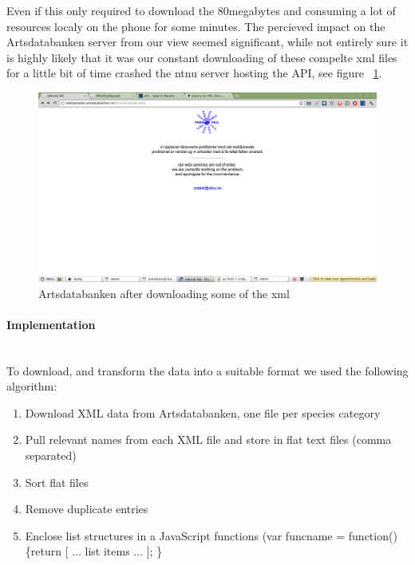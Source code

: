 		Even if this only required to download the 80megabytes and consuming a lot of resources localy on the phone for some minutes. 
		The percieved impact on the Artsdatabanken server from our view seemed significant, while not entirely sure it is highly likely that it was our constant downloading of these compelte xml files for a little bit of time crashed the ntnu server hosting the API, see figure ~\ref{fig:artsdatabanken_api}.

		\begin{figure}[htb]
			\centering
			\includegraphics[width=1\textwidth]{implementation/preparation/ntnu_server_artsdatabanken.png}
			\caption{Artsdatabanken after downloading some of the xml}
			\label{fig:artsdatabanken_api}
		\end{figure}

		\paragraph{Implementation} \hspace{1mm}\\
			To download, and transform the data into a suitable format we used the
			following algorithm:

			\begin{enumerate}
				\item Download XML data from Artsdatabanken, one file per species category
				\item Pull relevant names from each XML file and store in flat text files (comma separated)
				\item Sort flat files
				\item Remove duplicate entries
				\item Enclose list structures in a JavaScript functions (var
				funcname = function() \{return [ ... list items ... ]; \}
			\end{enumerate}


